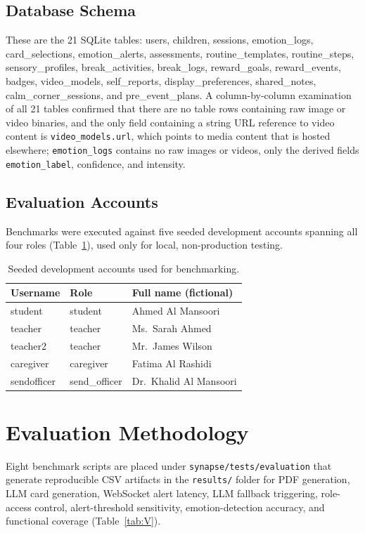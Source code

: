 \documentclass[conference]{IEEEtran}
\begin{document}
\subsection{Database Schema}
These are the 21 SQLite tables: users, children, sessions, emotion\_logs, card\_selections, emotion\_alerts, assessments, routine\_templates, routine\_steps, sensory\_profiles, break\_activities, break\_logs, reward\_goals, reward\_events, badges, video\_models, self\_reports, display\_preferences, shared\_notes, calm\_corner\_sessions, and pre\_event\_plans. A column-by-column examination of all 21 tables confirmed that there are no table rows containing raw image or video binaries, and the only field containing a string URL reference to video content is \texttt{video\_models.url}, which points to media content that is hosted elsewhere; \texttt{emotion\_logs} contains no raw images or videos, only the derived fields \texttt{emotion\_label}, confidence, and intensity.

\subsection{Evaluation Accounts}
Benchmarks were executed against five seeded development accounts spanning all four roles (Table~\ref{tab:IV}), used only for local, non-production testing.

\begin{table}[!t]
\caption{Seeded development accounts used for benchmarking.}
\label{tab:IV}
\centering
\small
\begin{tabular}{@{}lll@{}}
\toprule
\textbf{Username} & \textbf{Role} & \textbf{Full name (fictional)} \\
\midrule
student & student & Ahmed Al Mansoori \\
teacher & teacher & Ms.\ Sarah Ahmed \\
teacher2 & teacher & Mr.\ James Wilson \\
caregiver & caregiver & Fatima Al Rashidi \\
sendofficer & send\_officer & Dr.\ Khalid Al Mansoori \\
\bottomrule
\end{tabular}
\end{table}

\section{Evaluation Methodology}
Eight benchmark scripts are placed under \texttt{synapse/tests/evaluation} that generate reproducible CSV artifacts in the \texttt{results/} folder for PDF generation, LLM card generation, WebSocket alert latency, LLM fallback triggering, role-access control, alert-threshold sensitivity, emotion-detection accuracy, and functional coverage (Table~\ref{tab:V}).
\end{document}
